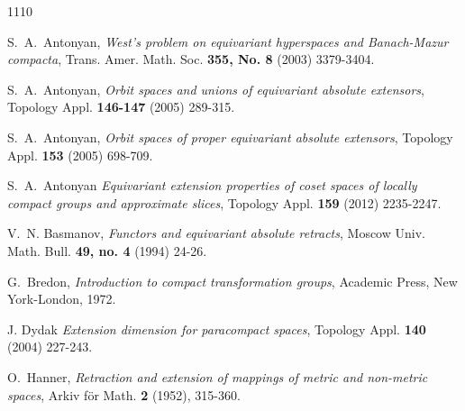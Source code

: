 \documentclass{amsart}
\begin{document}
\begin{thebibliography}{1110}


 S.~A.~Antonyan, {\em West's problem on equivariant hyperspaces and Banach-Mazur compacta},   Trans. Amer. Math. Soc. {\bf 355, No. 8} (2003) 3379-3404.




 S.~A.~Antonyan, {\em  Orbit spaces and unions of equivariant absolute extensors},  Topology Appl. {\bf 146-147} (2005) 289-315.

 S.~A.~Antonyan, {\em  Orbit spaces of proper equivariant absolute extensors},  Topology Appl. {\bf 153} (2005) 698-709.
 
 
 
  S.~A.~Antonyan {\em Equivariant extension properties of coset spaces of locally compact groups and approximate slices}, Topology Appl. {\bf 159} (2012)  2235-2247.  
 
 
   V.~N.  Basmanov, {\em Functors and equivariant absolute retracts}, Moscow Univ. Math. Bull. {\bf 49, no. 4} (1994)   24-26.


 G.~Bredon, {\em  Introduction to compact transformation groups},
 Academic Press,  New York-London, 1972.



J. Dydak {\em Extension dimension for paracompact spaces},  Topology Appl. {\bf 140} (2004) 227-243.



 O.~Hanner, {\em  Retraction and extension of mappings of metric and non-metric spaces}, Arkiv f\" or Math. {\bf 2} (1952), 315-360.


\end{thebibliography}
\end{document}
